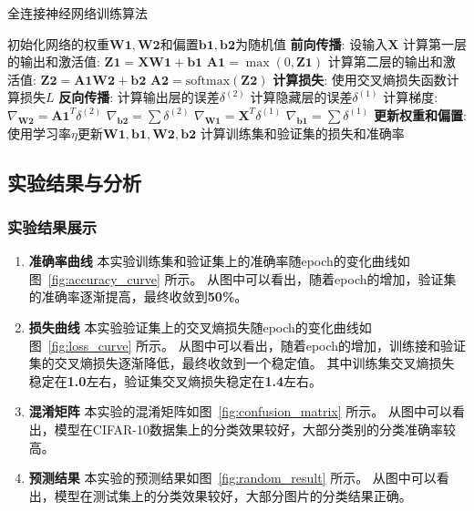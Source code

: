 \documentclass[12pt]{article}
\begin{document}
\begin{algorithm}
  \caption{全连接神经网络训练算法}
  \label{FullyConnectedNN Training Algorithm}
  \begin{algorithmic}[1]
    \State 初始化网络的权重$\mathbf{W1}, \mathbf{W2}$和偏置$\mathbf{b1}, \mathbf{b2}$为随机值
    \State \textbf{前向传播}:
    \State \quad 设输入$\mathbf{X}$
    \State \quad 计算第一层的输出和激活值:
    \State \quad \quad $\mathbf{Z1} = \mathbf{X} \mathbf{W1} + \mathbf{b1}$
    \State \quad \quad $\mathbf{A1} = \max(0, \mathbf{Z1})$ 
    \State \quad 计算第二层的输出和激活值:
    \State \quad \quad $\mathbf{Z2} = \mathbf{A1} \mathbf{W2} + \mathbf{b2}$
    \State \quad \quad $\mathbf{A2} = \text{softmax}(\mathbf{Z2})$
    \State \textbf{计算损失}:
    \State \quad 使用交叉熵损失函数计算损失$L$
    \State \textbf{反向传播}:
    \State \quad 计算输出层的误差$\delta^{(2)}$
    \State \quad 计算隐藏层的误差$\delta^{(1)}$
    \State \quad 计算梯度:
    \State \quad \quad $\nabla_{\mathbf{W2}} = \mathbf{A1}^T \delta^{(2)}$
    \State \quad \quad $\nabla_{\mathbf{b2}} = \sum \delta^{(2)}$
    \State \quad \quad $\nabla_{\mathbf{W1}} = \mathbf{X}^T \delta^{(1)}$
    \State \quad \quad $\nabla_{\mathbf{b1}} = \sum \delta^{(1)}$
    \State \textbf{更新权重和偏置}:
    \State \quad 使用学习率$\eta$更新$\mathbf{W1}, \mathbf{b1}, \mathbf{W2}, \mathbf{b2}$
    \EndFor
    \State 计算训练集和验证集的损失和准确率
    \EndFor
    \EndProcedure
  \end{algorithmic}
\end{algorithm}

\subsection{实验结果与分析}

\subsubsection{实验结果展示}

\begin{enumerate}
  \item \textbf{准确率曲线} 本实验训练集和验证集上的准确率随epoch的变化曲线如图~\ref{fig:accuracy_curve} 所示。
        从图中可以看出，随着epoch的增加，验证集的准确率逐渐提高，最终收敛到\textbf{50\%}。
  \item \textbf{损失曲线} 本实验验证集上的交叉熵损失随epoch的变化曲线如图~\ref{fig:loss_curve} 所示。
        从图中可以看出，随着epoch的增加，训练接和验证集的交叉熵损失逐渐降低，最终收敛到一个稳定值。
        其中训练集交叉熵损失稳定在\textbf{1.0}左右，验证集交叉熵损失稳定在\textbf{1.4}左右。
  \item \textbf{混淆矩阵} 本实验的混淆矩阵如图~\ref{fig:confusion_matrix} 所示。
        从图中可以看出，模型在CIFAR-10数据集上的分类效果较好，大部分类别的分类准确率较高。
  \item \textbf{预测结果} 本实验的预测结果如图~\ref{fig:random_result} 所示。
        从图中可以看出，模型在测试集上的分类效果较好，大部分图片的分类结果正确。
\end{enumerate}
\end{document}

